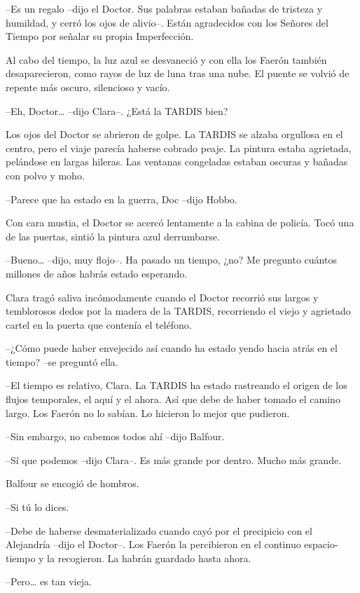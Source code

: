 {--Es un regalo --dijo el Doctor. Sus palabras estaban bañadas de
 tristeza y humildad, y cerró los ojos de alivio--. Están agradecidos con
los Señores del Tiempo por señalar su propia Imperfección.}

{Al cabo del tiempo, la luz azul se desvaneció y con ella los Faerón
 también desaparecieron, como rayos de luz de luna tras una nube. El
puente se volvió de repente más oscuro, silencioso y vacío.}

{--Eh, Doctor\ldots{} --dijo Clara--. ¿Está la TARDIS bien?}

{Los ojos del Doctor se abrieron de golpe. La TARDIS se alzaba orgullosa
 en el centro, pero el viaje parecía haberse cobrado peaje. La pintura
 estaba agrietada, pelándose en largas hileras. Las ventanas congeladas
estaban oscuras y bañadas con polvo y moho.}

{--Parece que ha estado en la guerra, Doc --dijo Hobbo.}

{Con cara mustia, el Doctor se acercó lentamente a la cabina de policía.
Tocó una de las puertas, sintió la pintura azul derrumbarse.}

{--Bueno\ldots{} --dijo, muy flojo--. Ha pasado un tiempo, ¿no? Me
pregunto cuántos millones de años habrás estado esperando.}

{Clara tragó saliva incómodamente cuando el Doctor recorrió sus largos y
 temblorosos dedos por la madera de la TARDIS, recorriendo el viejo y
agrietado cartel en la puerta que contenía el teléfono.}

{--¿Cómo puede haber envejecido así cuando ha estado yendo hacia atrás en
el tiempo? --se preguntó ella.}

{--El tiempo es relativo, Clara. La TARDIS ha estado rastreando el origen
 de los flujos temporales, el aquí y el ahora. Así que debe de haber
 tomado el camino largo. Los Faerón no lo sabían. Lo hicieron lo mejor
que pudieron.}

{--Sin embargo, no cabemos todos ahí --dijo Balfour.}

{--Sí que podemos --dijo Clara--. Es más grande por dentro. Mucho más
grande.}

{Balfour se encogió de hombros.}

{--Si tú lo dices.}

{--Debe de haberse desmaterializado cuando cayó por el precipicio con el
 Alejandría --dijo el Doctor--. Los Faerón la percibieron en el continuo
espacio-tiempo y la recogieron. La habrán guardado hasta ahora.}

{--Pero\ldots{} es tan vieja.}

